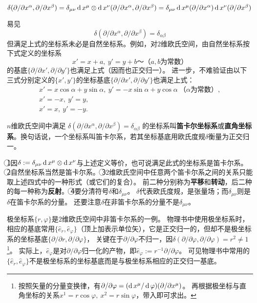 $\delta(\partial / \partial x^\alpha, \partial / \partial x^\beta) = \delta_{\mu\nu}\operatorname{d} x^\mu\otimes\operatorname{d} x^\nu(\partial / \partial  x^\alpha, \partial / \partial x^\beta) = \delta_{\mu\nu}\operatorname{d} x^\mu(\partial / \partial x^\alpha)\operatorname{d} x^\nu(\partial / \partial x^\beta)$

易见$$\delta(\partial / \partial x^\alpha, \partial / \partial x^\beta) = \delta_{\alpha\beta}$$
但满足上式的坐标系未必是自然坐标系。例如，对$2$维欧氏空间，由自然坐标系按下式定义的坐标系
$$x' = x + a, ~ y' = y +b ～ \text{（$a, b$为常数）}$$
的基底$\{\partial / \partial x', \partial / \partial y'\}$也满足上式（因而也正交归一）。
进一步，不难验证由以下三式分别定义的$\{x', y'\}$的坐标基底$\{\partial / \partial x', \partial / \partial y'\}$也满足上式：
\begin{gather*}
x' = x\cos\alpha + y\sin\alpha, ~ y' = -x\sin\alpha + y\cos\alpha ~ \text{（$\alpha$为常数）}, \\
x' = -x, ~ y' = y, \\
x' = x, ~ y' = -y.
\end{gather*}

\begin{definition}
$n$维欧氏空间中满足
$\delta(\partial / \partial x^\alpha, \partial / \partial x^\beta) = \delta_{\alpha\beta}$
的坐标系叫\textbf{笛卡尔坐标系}或\textbf{直角坐标系}。换句话说，一个坐标系叫笛卡尔系，若其坐标基底用欧氏度规$\delta$衡量为正交归一。
\end{definition}

\begin{note}
\textcircled{1}因$\delta := \delta_{\mu\nu}\operatorname{d} x^\mu\otimes\operatorname{d} x^\nu$与上述定义等价，也可说满足此式的坐标系是笛卡尔系。
\textcircled{2}自然坐标系当然是笛卡尔系。
\textcircled{3}$2$维欧氏空间中任意两个笛卡尔系之间的关系只能取上述四式中的一种形式（或它们的复合）。
前二种分别称为\textbf{平移}和\textbf{转动}，后二种的每一种称为\textbf{反射}。
\textcircled{4}要分清符号$\delta$和$\delta_{\mu\nu}$。
$\delta$代表欧氏度规，是张量场；而$\delta_{\mu\nu}$则是$\delta$在笛卡尔系的分量。
还要注意$\delta$在非笛卡尔系的分量不是$\delta_{\mu\nu}$。
\end{note}

极坐标系$\{r, \varphi\}$是$2$维欧氏空间中非笛卡尔系的一例。
物理书中使用极坐标系时，相应的基底常用$\{\hat{e}_r, \hat{e}_\varphi\}$（顶上加$\hat{}$表示单位矢），它是正交归一的，但却不是极坐标系的坐标基底$\{\partial / \partial r, \partial / \partial\varphi\}$，
关键在于$\partial / \partial\varphi$不归一，因$\delta(\partial / \partial\varphi, \partial / \partial\varphi) = r^2 \neq 1$\footnote{
按照矢量的分量变换律，有$\partial / \partial\varphi = (\operatorname{d} x^\mu / \operatorname{d}\varphi)(\partial / \partial x^\mu)$。
再根据极坐标与直角坐标的关系$x^1 = r\cos\varphi, ~ x^2 = r\sin\varphi$，带入即可求出。
}。
实际上，$\hat{e}_\varphi$是对$\partial / \partial\varphi$归一化的产物，即$\hat{e}_\varphi := r^{-1}\partial / \partial\varphi$。
可见物理书中常用的$\{\hat{e}_r, \hat{e}_\varphi\}$不是极坐标系的坐标基底而是与极坐标系相应的正交归一基底。

